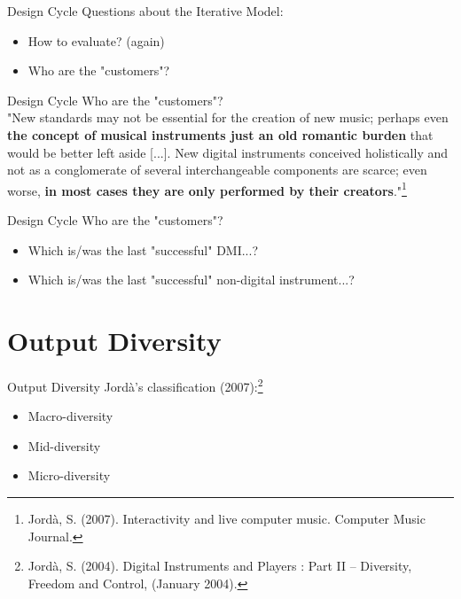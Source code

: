 \documentclass{beamer}
\begin{document}
\begin{frame}{Design Cycle}
    Questions about the Iterative Model:
    \begin{itemize}
        \item How to evaluate? (again)
        \item Who are the "customers"?
    \end{itemize}
\end{frame}

\begin{frame}{Design Cycle}
    Who are the "customers"?\\
    \vspace{5mm}
    "New standards may not be essential for the creation of new music; perhaps even \textbf{the concept of musical instruments just an old romantic burden} that would be better left aside [...]. New digital instruments conceived holistically and not as a conglomerate of several interchangeable components are scarce; even worse, \textbf{in most cases they are only performed by their creators}."\footnote{Jordà, S. (2007). Interactivity and live computer music. Computer Music Journal.}
\end{frame}

\begin{frame}{Design Cycle}
    Who are the "customers"?\\
    \vspace{5mm}
    \begin{itemize}
        \item Which is/was the last "successful" DMI...?\\
        \item Which is/was the last "successful" non-digital instrument...?
    \end{itemize}
\end{frame}


\section{Output Diversity}

\begin{frame}{Output Diversity}
    Jordà's classification (2007):\footnote{Jordà, S. (2004). Digital Instruments and Players : Part II – Diversity, Freedom and Control, (January 2004).}
    \begin{itemize}
        \item Macro-diversity
        \item Mid-diversity
        \item Micro-diversity
    \end{itemize}
\end{frame}
\end{document}
